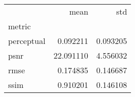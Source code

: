 \begin{tabular}{lrr}
\toprule
{} &       mean &       std \\
metric     &            &           \\
\midrule
perceptual &   0.092211 &  0.093205 \\
psnr       &  22.091110 &  4.556032 \\
rmse       &   0.174835 &  0.146687 \\
ssim       &   0.910201 &  0.146108 \\
\bottomrule
\end{tabular}
